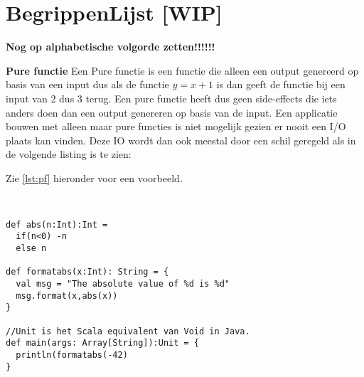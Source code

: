 
\chapter{BegrippenLijst [WIP]}



\textbf{Nog op alphabetische volgorde zetten!!!!!!}

\textbf{Pure functie}
Een Pure functie is een functie die alleen een output genereerd op basis van een input dus als de functie \( y = x+1\) is dan geeft de functie bij een input van 2 dus 3 terug. Een pure functie heeft dus geen side-effects die iets anders doen dan een output genereren op basis van de input. Een applicatie bouwen met alleen maar pure functies is niet mogelijk gezien er nooit een I/O plaats kan vinden. Deze IO wordt dan ook meestal door een schil geregeld als in de volgende listing is te zien:

Zie \autoref{lst:pf} hieronder voor een voorbeeld.

\begin{lstlisting}[caption={Pure functie met IO},label=lst:pf]


def abs(n:Int):Int =
  if(n<0) -n
  else n

def formatabs(x:Int): String = {
  val msg = "The absolute value of %d is %d"
  msg.format(x,abs(x))
}

//Unit is het Scala equivalent van Void in Java.
def main(args: Array[String]):Unit = {
  println(formatabs(-42)
}
\end{lstlisting}

